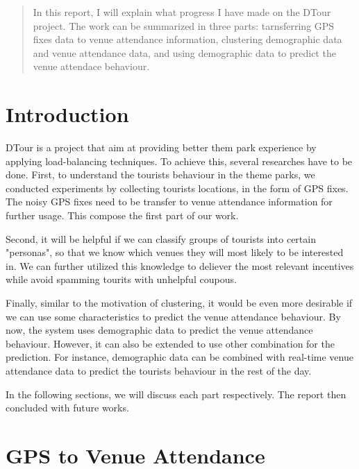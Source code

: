 \documentclass[12pt]{article}
\begin{document}
\maketitle

\begin{abstract}

In this report, I will explain what progress I have made on the DTour project. The work can be summarized in three parts: tarnsferring GPS fixes data to venue attendance information, clustering demographic data and venue attendance data, and using demographic data to predict the venue attendace behaviour.
\end{abstract}

\section{Introduction}

DTour is a project that aim at providing better them park experience by applying load-balancing techniques. To achieve this, several researches have to be done. First, to understand the tourists behaviour in the theme parks, we conducted experiments by collecting tourists locations, in the form of GPS fixes. The noisy GPS fixes need to be transfer to venue attendance information for further usage. This compose the first part of our work.

Second, it will be helpful if we can classify groups of tourists into certain "personas", so that we know which venues they will most likely to be interested in. We can further utilized this knowledge to deliever the most relevant incentives while avoid spamming tourits with unhelpful coupous.

Finally, similar to the motivation of clustering, it would be even more desirable if we can use some characteristics to predict the venue attendance behaviour. By now, the system uses demographic data to predict the venue attendance behaviour. However, it can also be extended to use other combination for the prediction. For instance, demographic data can be combined with real-time venue attendance data to predict the tourists behaviour in the rest of the day.

In the following sections, we will discuss each part respectively. The report then concluded with future works.

\section{GPS to Venue Attendance}\label{gps_venue}
\end{document}
